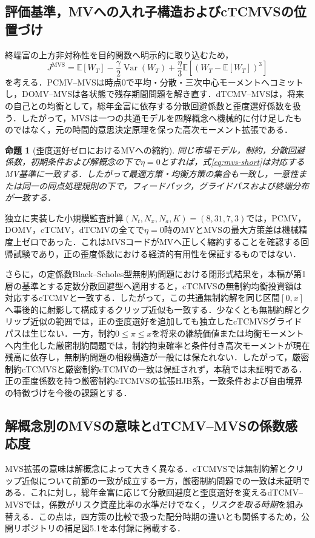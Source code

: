 \documentclass[10pt,a4paper]{article}
\theoremstyle{plain}
\newtheorem{proposition}{命題}
\theoremstyle{definition}
\newcommand{\E}{\mathbb{E}}
\DeclareMathOperator{\Var}{Var}
\begin{document}
\subsection{評価基準，MVへの入れ子構造およびcTCMVSの位置づけ}
終端富の上方非対称性を目的関数へ明示的に取り込むため，
\begin{equation}
J^{\mathrm{MVS}}=\E[W_T]-\frac{\gamma}{2}\Var(W_T)
+\frac{\eta}{3}\E[(W_T-\E[W_T])^3]
\label{eq:mvs-short}
\end{equation}
を考える．PCMV--MVSは時点0で平均・分散・三次中心モーメントへコミットし，DOMV--MVSは各状態で残存期間問題を解き直す．dTCMV--MVSは，将来の自己との均衡として，総年金富に依存する分散回避係数と歪度選好係数を扱う．したがって，MVSは一つの共通モデルを四解概念へ機械的に付け足したものではなく，元の時間的意思決定原理を保った高次モーメント拡張である．

\begin{proposition}[歪度選好ゼロにおけるMVへの縮約]
同じ市場モデル，制約，分散回避係数，初期条件および解概念の下で$\eta=0$とすれば，式\eqref{eq:mvs-short}は対応するMV基準に一致する．したがって最適方策・均衡方策の集合も一致し，一意性または同一の同点処理規則の下で，フィードバック，グライドパスおよび終端分布が一致する．
\end{proposition}

独立に実装した小規模監査計算$(N_t,N_x,N_a,K)=(8,31,7,3)$では，PCMV，DOMV，cTCMV，dTCMVの全てで$\eta=0$時のMVとMVSの最大方策差は機械精度上ゼロであった．これはMVSコードがMVへ正しく縮約することを確認する回帰試験であり，正の歪度係数における経済的有用性を保証するものではない．

さらに，\citet{MuTianYang2019}の定係数Black--Scholes型無制約問題における閉形式結果を，本稿が第1層の基準とする定数分散回避型へ適用すると，cTCMVSの無制約均衡投資額は対応するcTCMVと一致する．したがって，この共通無制約解を同じ区間$[0,x]$へ事後的に射影して構成するクリップ近似も一致する．少なくとも無制約解とクリップ近似の範囲では，正の歪度選好を追加しても独立したcTCMVSグライドパスは生じない．一方，制約$0\leq\pi\leq x$を将来の継続価値または均衡モーメントへ内生化した厳密制約問題では，制約拘束確率と条件付き高次モーメントが現在残高に依存し，無制約問題の相殺構造が一般には保たれない．したがって，厳密制約cTCMVSと厳密制約cTCMVの一致は保証されず，本稿では未証明である．正の歪度係数を持つ厳密制約cTCMVSの拡張HJB系，一致条件および自由境界の特徴づけを今後の課題とする．

\subsection{解概念別のMVSの意味とdTCMV--MVSの係数感応度}
\label{sec:mvs-exploratory}
MVS拡張の意味は解概念によって大きく異なる．cTCMVSでは無制約解とクリップ近似について前節の一致が成立する一方，厳密制約問題での一致は未証明である．これに対し，総年金富に応じて分散回避度と歪度選好を変えるdTCMV--MVSでは，係数がリスク資産比率の水準だけでなく，\emph{リスクを取る時期}を組み替える．この点は，四方策の比較で扱った配分時期の違いとも関係するため，公開リポジトリの補足図5.1を本付録に掲載する．
\end{document}
